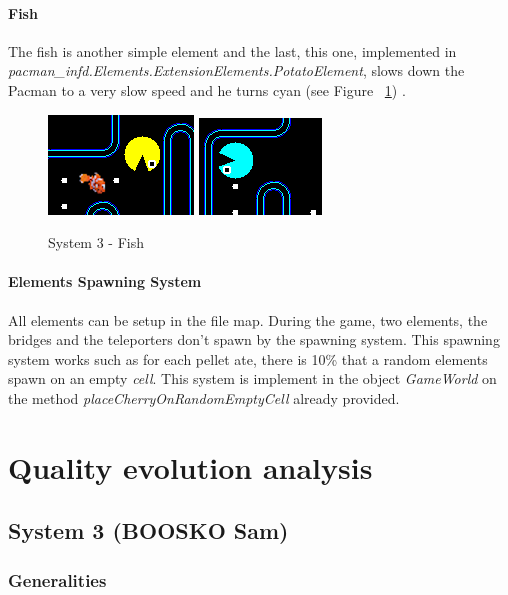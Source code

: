 \documentclass{article}
\begin{document}
\paragraph{Fish} The fish is another simple element and the last, this one, implemented in \textit{pacman\_infd.Elements.ExtensionElements.PotatoElement}, slows down the Pacman to a very slow speed and he turns cyan (see Figure ~\ref{fig:system3Fish}) . 

\begin{figure}
\centering
    \includegraphics[width=.3\linewidth]{imgs/fish1.PNG}
    \includegraphics[width=.3\linewidth]{imgs/fish2.PNG}
    \caption{System 3 - Fish}
    \label{fig:system3Fish}
\end{figure}

\paragraph{Elements Spawning System} All elements can be setup in the file map. During the game, two elements, the bridges and the teleporters don't spawn by the spawning system. This spawning system works such as for each pellet ate, there is 10\% that a random elements spawn on an empty \textit{cell}. This system is implement in the object \textit{GameWorld} on the method \textit{placeCherryOnRandomEmptyCell} already provided.

\section{Quality evolution analysis}

\subsection{System 3 (BOOSKO Sam)}

\subsubsection{Generalities}
\end{document}
